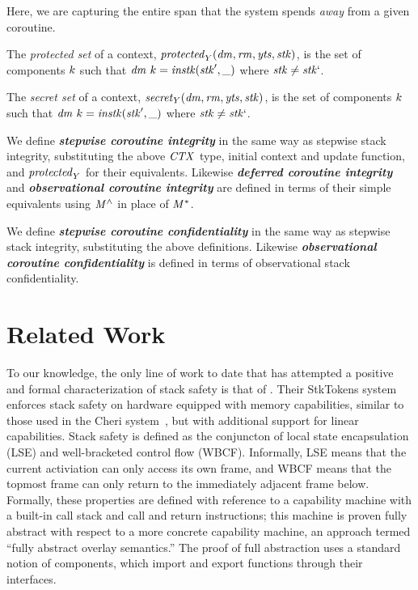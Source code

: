 \documentclass[acmsmall,review,anonymous]{acmart}\settopmatter{printfolios=true,printccs=false,printacmref=false}
\begin{document}
{{\noindent
Here, we are capturing the entire span that the system spends {\em away} from a given
coroutine.

The \emph{protected set} of a context, \(\mathit{protected}_Y(\mathit{dm},\mathit{rm},\mathit{yts},\mathit{stk})\),
is the set of components \(k\) such that
\(\mathit{dm} ~ k = \mathit{instk}(\mathit{stk}',\mbox{\_})\) where \(\mathit{stk} \not = \mathit{stk}`\).

The \emph{secret set} of a context, \(\mathit{secret}_Y(\mathit{dm},\mathit{rm},\mathit{yts},\mathit{stk})\),
is the set of components \(k\) such that
\(\mathit{dm} ~ k = \mathit{instk}(\mathit{stk}',\mbox{\_})\) where \(\mathit{stk} \not = \mathit{stk}`\).

We define \textbf{\em stepwise coroutine integrity} in the same way as stepwise stack integrity,
substituting the above \(\mathit{CTX}\) type, initial context and update
function, and \(\mathit{protected}_Y\) for their equivalents. Likewise
\textbf{\em deferred coroutine integrity} and \textbf{\em observational coroutine integrity} are defined
in terms of their simple equivalents using \(\mathit{M}^\wedge\) in place of \(\mathit{M}^*\).

We define \textbf{\em stepwise coroutine confidentiality} in the same way as stepwise stack
integrity, substituting the above definitions. Likewise
\textbf{\em observational coroutine confidentiality} is defined in terms of observational
stack confidentiality.

\section{Related Work}
\label{sec:relwork}

%
To our knowledge, the only line of work to date that has attempted
a positive and formal characterization of stack safety
is that of \citet{SkorstengaardSTKJFP}. Their
StkTokens system enforces stack safety on hardware equipped with
memory capabilities, similar to those used in the Cheri system~\citep{Woodruff+14,Chisnall+15}, but
with additional support for linear capabilities.
Stack safety is defined as the conjuncton of local state encapsulation (LSE) and
well-bracketed control flow (WBCF).
Informally, LSE means that the current activiation can only access its own frame,
and WBCF means that the topmost frame can only return to
the immediately adjacent frame below. Formally, these properties are defined
with reference to a capability machine with a built-in call stack and call and return
instructions; this machine is proven fully abstract with respect to a more
concrete capability machine, an approach termed ``fully abstract overlay semantics.''
The proof of full abstraction uses a standard notion of components, which
import and export functions through their interfaces.

}}
\end{document}
